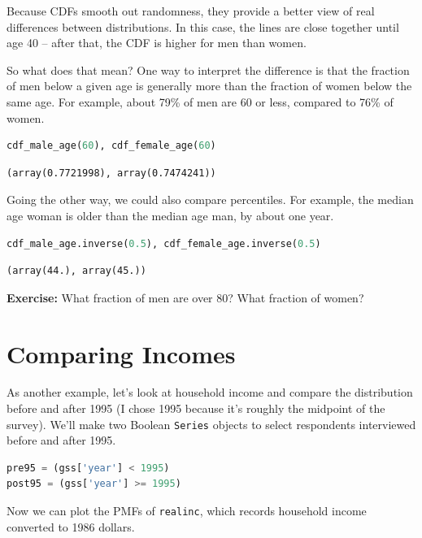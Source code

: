 \documentclass[
]{book}
\newcommand{\passthrough}[1]{#1}
\begin{document}
Because CDFs smooth out randomness, they provide a better view of real
differences between distributions. In this case, the lines are close
together until age 40 -- after that, the CDF is higher for men than
women.

So what does that mean? One way to interpret the difference is that the
fraction of men below a given age is generally more than the fraction of
women below the same age. For example, about 79\% of men are 60 or less,
compared to 76\% of women.

\begin{lstlisting}[language=Python]
cdf_male_age(60), cdf_female_age(60)
\end{lstlisting}

\begin{lstlisting}
(array(0.7721998), array(0.7474241))
\end{lstlisting}

Going the other way, we could also compare percentiles. For example, the
median age woman is older than the median age man, by about one year.

\begin{lstlisting}[language=Python]
cdf_male_age.inverse(0.5), cdf_female_age.inverse(0.5)
\end{lstlisting}

\begin{lstlisting}
(array(44.), array(45.))
\end{lstlisting}

\textbf{Exercise:} What fraction of men are over 80? What fraction of
women?

\section{Comparing Incomes}\label{comparing-incomes}

As another example, let's look at household income and compare the
distribution before and after 1995 (I chose 1995 because it's roughly
the midpoint of the survey). We'll make two Boolean
\passthrough{\lstinline!Series!} objects to select respondents
interviewed before and after 1995.

\begin{lstlisting}[language=Python]
pre95 = (gss['year'] < 1995)
post95 = (gss['year'] >= 1995)
\end{lstlisting}

Now we can plot the PMFs of \passthrough{\lstinline!realinc!}, which
records household income converted to 1986 dollars.
\end{document}
